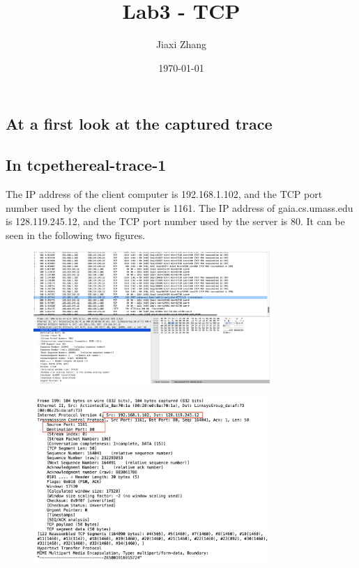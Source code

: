 \documentclass{article}
\title{Lab3 - TCP}
\author{Jiaxi Zhang}
\date{\today}
\begin{document}
\maketitle
\begin{CJK*}{UTF8}{gbsn}
\section{At a first look at the captured trace}
\subsection{In tcpethereal-trace-1}
The IP address of the client computer is 192.168.1.102,
and the TCP port number used by the client computer is 1161.
The IP address of gaia.cs.umass.edu is 128.119.245.12, and the TCP port number used by the server is 80.
It can be seen in the following two figures.
\begin{figure}[H]
\centering
\includegraphics[width=0.8\textwidth]{1-2.png}
\end{figure}
\begin{figure}[H]
\centering
\includegraphics[width=0.8\textwidth]{1-1.png}
\end{figure}


\end{CJK*}
\end{document}
